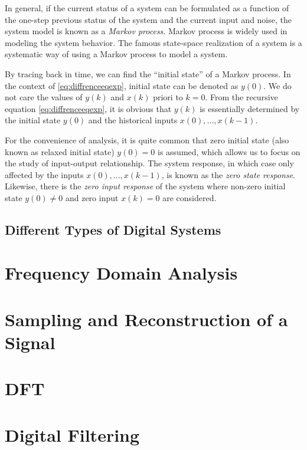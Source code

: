 In general, if the current status of a system can be formulated as a function of the one-step previous status of the system and the current input and noise, the system model is known as a \textit{Markov process}. Markov process is widely used in modeling the system behavior. The famous state-space realization of a system is a systematic way of using a Markov process to model a system. 

By tracing back in time, we can find the ``initial state'' of a Markov process. In the context of \eqref{eq:diffrenceeqexp}, initial state can be denoted as $y(0)$. We do not care the values of $y(k)$ and $x(k)$ priori to $k=0$. From the recursive equation \eqref{eq:diffrenceeqexp}, it is obvious that $y(k)$ is essentially determined by the initial state $y(0)$ and the historical inputs $x(0), ..., x(k-1)$.

For the convenience of analysis, it is quite common that zero initial state (also known as relaxed initial state) $y(0)=0$ is assumed, which allows us to focus on the study of input-output relationship. The system response, in which case only affected by the inputs $x(0), ..., x(k-1)$, is known as the \textit{zero state response}. Likewise, there is the \textit{zero input response} of the system where non-zero initial state $y(0)\neq 0$ and zero input $x(k)=0$ are considered.

\subsection{Different Types of Digital Systems} 







\section{Frequency Domain Analysis}


\section{Sampling and Reconstruction of a Signal}

\section{DFT}

\section{Digital Filtering}









